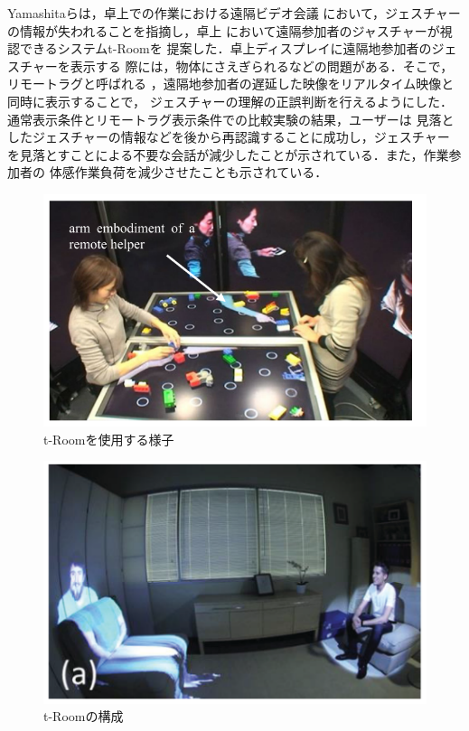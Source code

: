 Yamashitaら\cite{28}は，卓上での作業における遠隔ビデオ会議
において，ジェスチャーの情報が失われることを指摘し，卓上
において遠隔参加者のジャスチャーが視認できるシステムt-Roomを
提案した．卓上ディスプレイに遠隔地参加者のジェスチャーを表示する
際には，物体にさえぎられるなどの問題がある．そこで，リモートラグと呼ばれる
，遠隔地参加者の遅延した映像をリアルタイム映像と同時に表示することで，
ジェスチャーの理解の正誤判断を行えるようにした．
通常表示条件とリモートラグ表示条件での比較実験の結果，ユーザーは
見落としたジェスチャーの情報などを後から再認識することに成功し，ジェスチャー
を見落とすことによる不要な会話が減少したことが示されている．また，作業参加者の
体感作業負荷を減少させたことも示されている．

\begin{figure}[tbp]
  \centering
  \includegraphics[scale=0.7]{fig/tRoom.png}
  \caption{t-Roomを使用する様子\cite{27}}
\end{figure}

\begin{figure}[tbp]
  \centering
  \includegraphics[scale=1.0]{fig/2room2.png}
  \caption{t-Roomの構成\cite{27}}
\end{figure}

